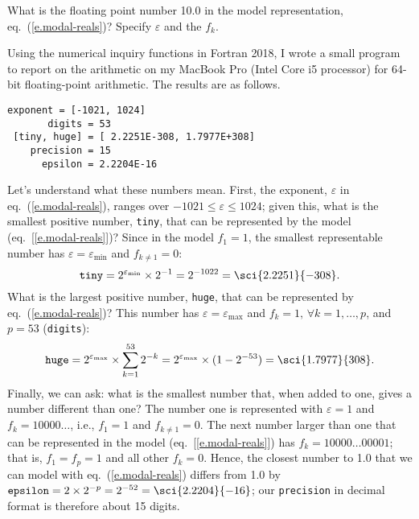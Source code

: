 \begin{exercisebox}
What is the floating point number 10.0 in the model representation, eq.~(\ref{e.modal-reals})? Specify $\varepsilon$ and the $f_{k}$.
\label{ex.binary-representation}
\end{exercisebox}

Using the numerical inquiry functions in Fortran 2018, I wrote a small program to report on the arithmetic on my MacBook Pro (Intel Core i5 processor) for 64-bit floating-point arithmetic. The results are as follows.
\begin{Verbatim}[numbers=none]
     exponent = [-1021, 1024]
       digits = 53
 [tiny, huge] = [ 2.2251E-308, 1.7977E+308]
    precision = 15
      epsilon = 2.2204E-16
\end{Verbatim}
Let's understand what these numbers mean.
First, the exponent, $\varepsilon$ in eq.~(\ref{e.modal-reals}), ranges over $-1021\le\varepsilon\le1024$;%
given this, what is the smallest positive number, \texttt{tiny}, that can be represented by the model (eq.~[\ref{e.modal-reals}])? Since in the model $f_{1}=1$, the smallest representable number has $\varepsilon = \varepsilon_{\min}$ and $f_{k\neq 1} = 0$:
\[\mathtt{tiny} = 2^{\varepsilon_{\min}}\times 2^{-1} = 2^{-1022} = \sci{2.2251}{-308}.\]
What is the largest positive number, \texttt{huge}, that can be represented by eq.~(\ref{e.modal-reals})? This number has $\varepsilon=\varepsilon_{\max}$ and $f_{k}=1,\,\forall k=1,\ldots,p$, and $p = 53$ (\texttt{digits}):
\[
\mathtt{huge} = 2^{\varepsilon_{\max}}\times \sum_{k=1}^{53} 2^{-k} = 2^{\varepsilon_{\max}}\times(1-2^{-53}) = \sci{1.7977}{308}.
\]
Finally, we can ask: what is the smallest number that, when added to one, gives a number different than one? The number one is represented with $\varepsilon = 1$ and $f_{k} = 10000\ldots$, i.e., $f_{1}=1$ and $f_{k\neq1}=0$. The next number larger than one that can be represented in the model (eq.~[\ref{e.modal-reals}]) has $f_{k} = 10000\ldots00001$; that is, $f_{1}=f_{p}=1$ and all other $f_{k}=0$. Hence, the closest number to 1.0 that we can model with eq.~(\ref{e.modal-reals}) differs from 1.0 by $\mathtt{epsilon} = 2\times2^{-p} = 2^{-52} = \sci{2.2204}{-16}$; our \verb+precision+ in decimal format is therefore about 15 digits.


